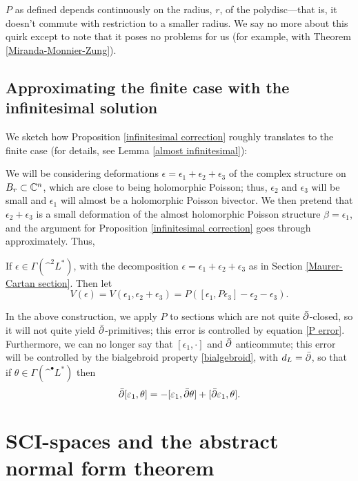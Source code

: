 \documentclass{article}
\begin{document}
$P$ as defined depends continuously on the radius, $r$, of the polydisc---that is, it doesn't commute with restriction to a smaller radius.  We say no more about this quirk except to note that it poses no problems for us (for example, with Theorem \ref{Miranda-Monnier-Zung}).


\subsection{Approximating the finite case with the infinitesimal solution}

We sketch how Proposition \ref{infinitesimal correction} roughly translates to the finite case (for details, see Lemma \ref{almost infinitesimal}):

We will be considering deformations $\epsilon = \epsilon_1 + \epsilon_2 + \epsilon_3$ of the complex structure on $B_r \subset \mathbb C^n$, which are close to being holomorphic Poisson; thus, $\epsilon_2$ and $\epsilon_3$ will be small and $\epsilon_1$ will almost be a holomorphic Poisson bivector.  We then pretend that $\epsilon_2 + \epsilon_3$ is a small deformation of the almost holomorphic Poisson structure $\beta = \epsilon_1$, and the argument for Proposition \ref{infinitesimal correction} goes through approximately.  Thus,

\begin{defn}\label{define V}
If $\epsilon \in \Gamma(\^ ^2 L^*)$, with the decomposition $\epsilon = \epsilon_1 + \epsilon_2 + \epsilon_3$ as in Section \ref{Maurer-Cartan section}.  Then let
$$V(\epsilon) = V(\epsilon_1,\epsilon_2 + \epsilon_3) = P([\epsilon_1, P\epsilon_3] - \epsilon_2 - \epsilon_3).$$
\end{defn}

In the above construction, we apply $P$ to sections which are not quite $\bar{\partial}$-closed, so it will not quite yield $\bar{\partial}$-primitives; this error is controlled by equation \eqref{P error}.  Furthermore, we can no longer say that $[\epsilon_1,\cdot]$ and $\bar{\partial}$ anticommute; this error will be controlled by the bialgebroid property \eqref{bialgebroid}, with $d_L = \bar{\partial}$, so that if $\theta \in \Gamma(\^ ^\bullet L^*)$ then
\begin{equation}\label{anticommute error}
\bar\del[\epsilon_1, \theta] = -[\epsilon_1, \bar\del \theta] + [\bar\del\epsilon_1, \theta].
\end{equation}




\section{SCI-spaces and the abstract normal form theorem}\label{SCI section}
\end{document}
